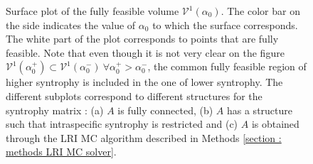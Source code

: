 \documentclass[12pt, titlepage]{report}
\begin{document}
\begin{figure}[h!]
\hspace{-0.1\linewidth}
\captionsetup[subfigure]{captionskip = -185pt, margin = 195pt}
\begin{center}
\end{center}
\caption[caption for LOF]{Surface plot of the fully feasible volume $\mathcal{V}^1(\alpha_0)$. The color bar on the side indicates the value of $\alpha_0$ to which the surface corresponds. The white part of the plot corresponds to points that  are fully feasible. Note that even though it is not very clear on the figure $\mathcal{V}^1(\alpha_0^+) \subset \mathcal{V}^1(\alpha_0^-) \ \forall \alpha_0^+ > \alpha_0^-$, \ie the common fully feasible region of higher syntrophy is included in the one of lower syntrophy. The different subplots correspond to different structures for the syntrophy matrix : (a) $A$ is fully connected, (b) $A$ has a structure such that intraspecific syntrophy is restricted and (c) $A$ is obtained through the LRI MC algorithm described in Methods \ref{section : methods LRI MC solver}.} \label{fig : results feasibility cfv variation with syntrophy}
\end{figure}
\end{document}

